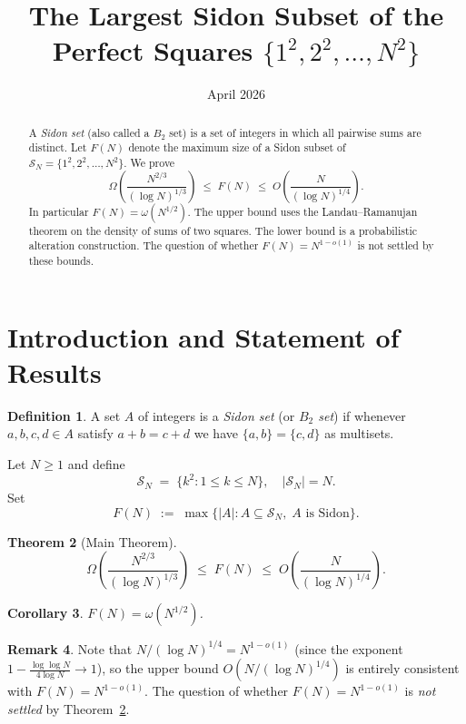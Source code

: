 \documentclass[12pt]{article}
\title{The Largest Sidon Subset of the Perfect Squares
$\{1^2, 2^2, \ldots, N^2\}$}
\author{}
\date{April 2026}
\newtheorem{theorem}{Theorem}[section]
\newtheorem{corollary}[theorem]{Corollary}
\theoremstyle{definition}
\newtheorem{definition}[theorem]{Definition}
\newtheorem{remark}[theorem]{Remark}
\newcommand{\SN}{\mathcal{S}_N}
\begin{document}
\maketitle

\begin{abstract}
A \emph{Sidon set} (also called a $B_2$ set) is a set of integers in which
all pairwise sums are distinct.  Let $F(N)$ denote the maximum size of a
Sidon subset of $\mathcal{S}_N = \{1^2, 2^2, \ldots, N^2\}$.  We prove
\[
  \Omega\!\left(\frac{N^{2/3}}{(\log N)^{1/3}}\right)
  \;\le\;
  F(N)
  \;\le\;
  O\!\left(\frac{N}{(\log N)^{1/4}}\right).
\]
In particular $F(N) = \omega(N^{1/2})$.  The upper bound uses the
Landau--Ramanujan theorem on the density of sums of two squares.
The lower bound is a probabilistic alteration construction.
The question of whether $F(N) = N^{1-o(1)}$ is not settled by these bounds.
\end{abstract}

\tableofcontents

\section{Introduction and Statement of Results}

\begin{definition}
A set $A$ of integers is a \emph{Sidon set} (or \emph{$B_2$ set}) if
whenever $a,b,c,d \in A$ satisfy $a+b = c+d$ we have $\{a,b\} = \{c,d\}$
as multisets.
\end{definition}

Let $N \ge 1$ and define
\[
  \SN \;=\; \{k^2 : 1 \le k \le N\}, \quad |\SN| = N.
\]
Set
\[
  F(N) \;:=\; \max\bigl\{|A| : A \subseteq \SN,\; A \text{ is Sidon}\bigr\}.
\]

\begin{theorem}[Main Theorem]\label{thm:main}
\[
  \Omega\!\left(\frac{N^{2/3}}{(\log N)^{1/3}}\right)
  \;\le\;
  F(N)
  \;\le\;
  O\!\left(\frac{N}{(\log N)^{1/4}}\right).
\]
\end{theorem}

\begin{corollary}\label{cor:not-N}
$F(N) = \omega(N^{1/2})$.
\end{corollary}

\begin{remark}\label{rem:N1-o1}
Note that $N/(\log N)^{1/4} = N^{1-o(1)}$ (since the exponent
$1 - \frac{\log\log N}{4\log N} \to 1$), so the upper bound
$O(N/(\log N)^{1/4})$ is entirely consistent with $F(N) = N^{1-o(1)}$.
The question of whether $F(N) = N^{1-o(1)}$ is \emph{not settled}
by Theorem~\ref{thm:main}.
\end{remark}
\end{document}
